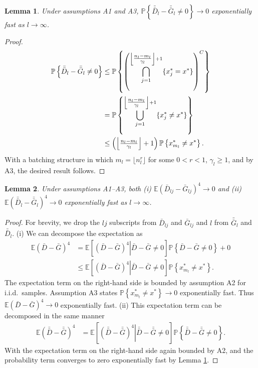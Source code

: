 \documentclass[12pt]{article}
\newtheorem{lemma}{Lemma}
\newcommand{\p}[1]{\mathbb{P} \left\{ #1 \right\}}
\newcommand{\e}[1]{\mathbb{E} %
#1 %
}
\newcommand{\x}{x}
\newcommand{\xs}{\x^*}
\newcommand{\nbl}{\left\lfloor\tfrac{n_l-m_l}{\gamma_l}\right\rfloor+1}
\newcommand{\gb}{\bar{G}}
\newcommand{\gbb}{\bar{\gb}}
\newcommand{\db}{\bar{D}}
\newcommand{\dbb}{\bar{\db}}
\begin{document}
\begin{lemma} \label{lem:gbb_prob}
	Under assumptions A1 and A3, $\p{\dbb_l - \gbb_l \neq 0} \rightarrow 0$ exponentially fast as $l \rightarrow \infty$.
\end{lemma}

\begin{proof}
	\begin{align}
		\p{\dbb_l - \gbb_l \neq 0} & \leq \p{\left( \bigcap_{j=1}^{\nbl} \{\xs_{j} = \xs\} \right)^C} \notag \\
		& = \p{ \bigcup_{j=1}^{\nbl} \{\xs_{j} \neq \xs\}} \notag \\
		& \leq \left( \nbl\right) \p{ \xs_{m_l} \neq \xs }. \notag
	\end{align}
	With a batching structure in which $m_l = \lfloor n_l^{r} \rfloor$ for some $0<r<1$,  $\gamma_l \geq 1$, and by A3, the desired result follows.
\end{proof}

\begin{lemma} \label{lem:gb_gbb_l4}
	Under assumptions A1--A3, both (i) $\e{(\db_{lj} - \gb_{lj})^4} \rightarrow 0$ and (ii) $\e{(\dbb_l - \gbb_l)^4} \rightarrow 0$ exponentially fast as $l \rightarrow \infty$.
\end{lemma}

\begin{proof}
	For brevity, we drop the $lj$ subscripts from $\db_{lj}$ and $\gb_{lj}$ and $l$ from $\gbb_l$ and $\dbb_l$.
	(i) We can decompose the expectation as
	\begin{align*}
		\e{(\db - \gb)^4} & = \e{\left[ \left.(\db - \gb)^4 \right| \db - \gb \neq 0\right]} \p{\db - \gb \neq 0} + 0\\
		& \leq \e{\left[ \left.(\db - \gb)^4 \right| \db - \gb \neq 0 \right]} \p{ \xs_{m_l}  \neq \xs}.
	\end{align*}
	The expectation term on the right-hand side is bounded by assumption A2 for i.i.d.\ samples.  
        Assumption A3 states $\p{\xs_{m_l} \neq \xs} \rightarrow 0$ exponentially fast.  
        Thus $\e{(\db - \gb)^4} \rightarrow 0$ exponentially fast.
(ii) This expectation term can be decomposed in the same manner
	\begin{align*}
		\e{(\dbb - \gbb)^4} & = \e{\left[ \left. (\dbb - \gbb)^4 \right| \dbb - \gbb \neq 0\right]} \p{\dbb - \gbb \neq 0}.
	\end{align*}
	With the expectation term on the right-hand side again bounded by A2, and the probability term converges to zero exponentially fast by Lemma \ref{lem:gbb_prob}.
\end{proof}
\end{document}
